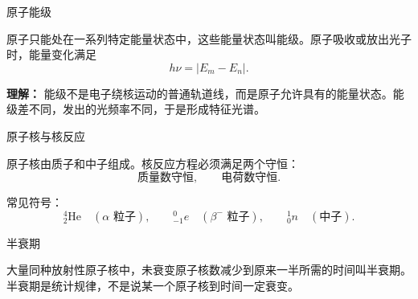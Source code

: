 \begin{conceptbox}{原子能级}

原子只能处在一系列特定能量状态中，这些能量状态叫能级。原子吸收或放出光子时，能量变化满足
\[
\boxed{h\nu=|E_m-E_n|}.
\]

\begin{center}


\label{fig:energy-level-transition}
\end{center}

\textbf{理解：} 能级不是电子绕核运动的普通轨道线，而是原子允许具有的能量状态。能级差不同，发出的光频率不同，于是形成特征光谱。
\end{conceptbox}

\begin{conceptbox}{原子核与核反应}

原子核由质子和中子组成。核反应方程必须满足两个守恒：
\[
\boxed{\text{质量数守恒}},\qquad
\boxed{\text{电荷数守恒}}.
\]

\begin{center}


\label{fig:nuclear-reaction-balance}
\end{center}

常见符号：
\[
{}^4_2\mathrm{He}\quad(\alpha\text{ 粒子}),\qquad
{}^0_{-1}e\quad(\beta^-\text{ 粒子}),\qquad
{}^1_0n\quad(\text{中子}).
\]
\end{conceptbox}

\begin{conceptbox}{半衰期}

大量同种放射性原子核中，未衰变原子核数减少到原来一半所需的时间叫半衰期。半衰期是统计规律，不是说某一个原子核到时间一定衰变。

\begin{center}
\begin{minipage}{\linewidth}
\centering


\label{fig:half-life-curve}
\end{minipage}
\end{center}
\end{conceptbox}

